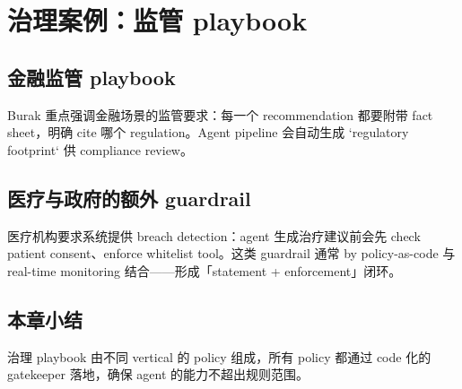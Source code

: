 \section{治理案例：监管 playbook}

\subsection{金融监管 playbook}

Burak 重点强调金融场景的监管要求：每一个 recommendation 都要附带 fact sheet，明确 cite 哪个 regulation。Agent pipeline 会自动生成 `regulatory footprint` 供 compliance review。

\subsection{医疗与政府的额外 guardrail}

医疗机构要求系统提供 breach detection：agent 生成治疗建议前会先 check patient consent、enforce whitelist tool。这类 guardrail 通常 by policy-as-code 与 real-time monitoring 结合——形成「statement + enforcement」闭环。

\subsection{本章小结}

治理 playbook 由不同 vertical 的 policy 组成，所有 policy 都通过 code 化的 gatekeeper 落地，确保 agent 的能力不超出规则范围。

